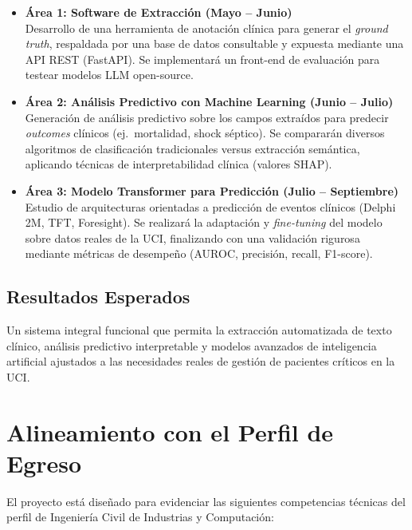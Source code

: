 \documentclass[11pt,a4paper]{article}
\begin{document}
\begin{itemize}
    \item \textbf{Área 1: Software de Extracción (Mayo – Junio)}\\
    Desarrollo de una herramienta de anotación clínica para generar el \textit{ground truth},
    respaldada por una base de datos consultable y expuesta mediante una API REST (FastAPI).
    Se implementará un front-end de evaluación para testear modelos LLM open-source.

    \item \textbf{Área 2: Análisis Predictivo con Machine Learning (Junio – Julio)}\\
    Generación de análisis predictivo sobre los campos extraídos para predecir
    \textit{outcomes} clínicos (ej.\ mortalidad, shock séptico). Se compararán diversos
    algoritmos de clasificación tradicionales versus extracción semántica, aplicando técnicas
    de interpretabilidad clínica (valores SHAP).

    \item \textbf{Área 3: Modelo Transformer para Predicción (Julio – Septiembre)}\\
    Estudio de arquitecturas orientadas a predicción de eventos clínicos (Delphi 2M, TFT,
    Foresight). Se realizará la adaptación y \textit{fine-tuning} del modelo sobre datos
    reales de la UCI, finalizando con una validación rigurosa mediante métricas de desempeño
    (AUROC, precisión, recall, F1-score).
\end{itemize}

\subsection*{Resultados Esperados}
Un sistema integral funcional que permita la extracción automatizada de texto clínico, análisis
predictivo interpretable y modelos avanzados de inteligencia artificial ajustados a las
necesidades reales de gestión de pacientes críticos en la UCI.

\vspace{0.5cm}

\section*{Alineamiento con el Perfil de Egreso}

El proyecto está diseñado para evidenciar las siguientes competencias técnicas del perfil de
Ingeniería Civil de Industrias y Computación:
\end{document}
